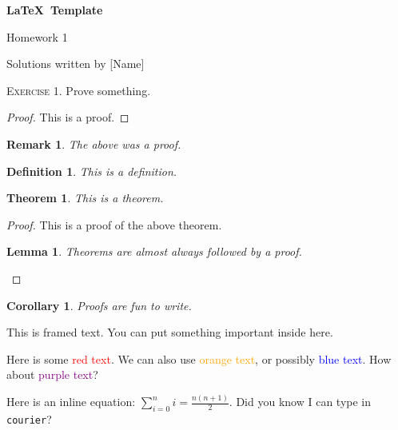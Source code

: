 \documentclass{article}
\newtheorem{thm}{Theorem}
\newtheorem{rem}{Remark}
\newtheorem{cor}{Corollary}
\newtheorem{lem}{Lemma}
\newtheorem{defn}{Definition}
\begin{document}
\centerline{\huge{\bf{\LaTeX \ Template}}}
\vspace{0.2in}
\centerline{\large{Homework 1}}
\vspace{0.1in}
\centerline{Solutions written by [Name]}
\vspace{0.3in}

\begin{tcolorbox}
\noindent \textsc{Exercise 1.} Prove something.
\end{tcolorbox}


\begin{proof}
This is a proof. 
\end{proof}

\begin{rem}
The above was a proof.
\end{rem}

\begin{defn}
This is a definition.
\end{defn}

\begin{thm}
This is a theorem.
\end{thm}

\begin{proof}
This is a proof of the above theorem.

\begin{lem}
Theorems are almost always followed by a proof.
\end{lem}

\end{proof}

\begin{cor}
Proofs are fun to write. 
\end{cor}


\begin{framed}
This is framed text. You can put something important inside here. 
\end{framed}

Here is some \textcolor{red}{red text}. We can also use \textcolor{orange}{orange text}, or possibly \textcolor{blue}{blue text}. How about \textcolor{purple}{purple text}?

\vspace{0.1in} %

Here is an inline equation: $\displaystyle{\sum_{i = 0}^{n} i = \frac{n(n+1)}{2}}$. Did you know I can type in \texttt{courier}?

\vspace{0.1in}
\end{document}
